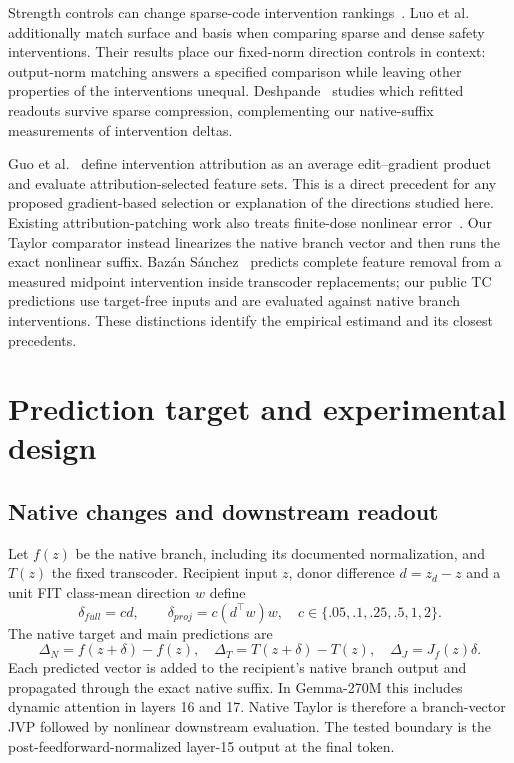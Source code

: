 \documentclass[11pt]{article}
\begin{document}
Strength controls can change sparse-code intervention rankings~\cite{zhang2026}. Luo et al.~\cite{luo2026} additionally match surface and basis when comparing sparse and dense safety interventions. Their results place our fixed-norm direction controls in context: output-norm matching answers a specified comparison while leaving other properties of the interventions unequal. Deshpande~\cite{deshpande2026} studies which refitted readouts survive sparse compression, complementing our native-suffix measurements of intervention deltas.

Guo et al.~\cite{guo2026} define intervention attribution as an average edit--gradient product and evaluate attribution-selected feature sets. This is a direct precedent for any proposed gradient-based selection or explanation of the directions studied here. Existing attribution-patching work also treats finite-dose nonlinear error~\cite{zhangwang2026}. Our Taylor comparator instead linearizes the native branch vector and then runs the exact nonlinear suffix. Baz\'an S\'anchez~\cite{bazan2026} predicts complete feature removal from a measured midpoint intervention inside transcoder replacements; our public TC predictions use target-free inputs and are evaluated against native branch interventions. These distinctions identify the empirical estimand and its closest precedents.

\section{Prediction target and experimental design}
\subsection{Native changes and downstream readout}
Let $f(z)$ be the native branch, including its documented normalization, and $T(z)$ the fixed transcoder. Recipient input $z$, donor difference $d=z_d-z$ and a unit FIT class-mean direction $w$ define
\[
 \delta_{full}=cd,\qquad \delta_{proj}=c(d^\top w)w,
 \quad c\in\{.05,.1,.25,.5,1,2\}.
\]
The native target and main predictions are
\[
 \Delta_N=f(z+\delta)-f(z),\quad
 \Delta_T=T(z+\delta)-T(z),\quad
 \Delta_J=J_f(z)\delta.
\]
Each predicted vector is added to the recipient's native branch output and propagated through the exact native suffix. In Gemma-270M this includes dynamic attention in layers 16 and 17. Native Taylor is therefore a branch-vector JVP followed by nonlinear downstream evaluation. The tested boundary is the post-feedforward-normalized layer-15 output at the final token.
\end{document}
